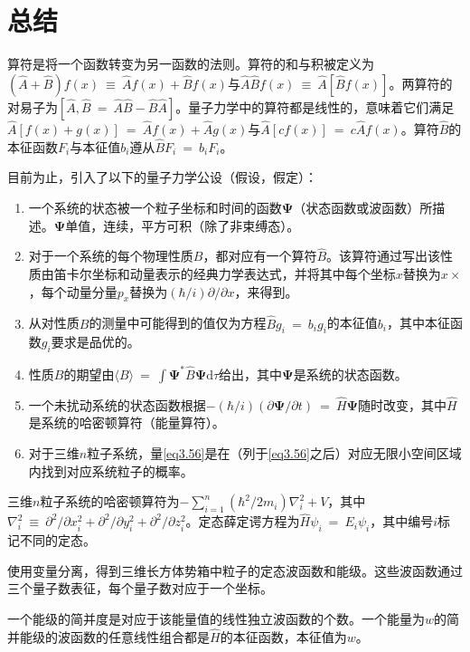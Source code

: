 \documentclass[12pt,a4paper,openany]{ctexbook}
\newcommand{\ang}[1]{\langle #1 \rangle}
\newcommand{\bp}{\bm{\Psi}}
\newcommand{\dd}[1]{\mathrm{d} #1}
\begin{document}
\section*{总结}
\begin{flushleft}
    \setlength{\parindent}{2em}
算符是将一个函数转变为另一函数的法则。算符的和与积被定义为$(\hat{A}+\hat{B})f(x)\ \equiv\ \hat{A}f(x)+\hat{B}f(x)$与$\hat{A}\hat{B}f(x)\ \equiv\ \hat{A}[\hat{B}f(x)]$。两算符的对易子为$[\hat{A},\hat{B}\ =\ \hat{A}\hat{B}-\hat{B}\hat{A}]$。量子力学中的算符都是线性的，意味着它们满足$\hat{A}[f(x)+g(x)]\ =\ \hat{A}f(x)+\hat{A}g(x)$与$\hat{A}[cf(x)]\ =\ c\hat{A}f(x)$。算符$\hat{B}$的本征函数$F_i$与本征值$b_i$遵从$\hat{B}F_i\ =\ b_iF_i$。

目前为止，引入了以下的量子力学公设（假设，假定）：
\begin{enumerate}[label=(\alph*)]
    \item 一个系统的状态被一个粒子坐标和时间的函数$\bp$（状态函数或波函数）所描述。$\bp$单值，连续，平方可积（除了非束缚态）。
    \item 对于一个系统的每个物理性质$B$，都对应有一个算符$\hat{B}$。该算符通过写出该性质由笛卡尔坐标和动量表示的经典力学表达式，并将其中每个坐标$x$替换为$x\times$，每个动量分量$p_x$替换为$(\hbar/i)\partial/\partial x$，来得到。
    \item 从对性质$B$的测量中可能得到的值仅为方程$\hat{B}g_i\ =\ b_ig_i$的本征值$b_i$，其中本征函数$g_i$要求是品优的。
    \item 性质$B$的期望由$\ang{B}\ =\ \int\bp^*\hat{B}\bp\dd\tau$给出，其中$\bp$是系统的状态函数。
    \item 一个未扰动系统的状态函数根据$-(\hbar/i)(\partial\bp/\partial t)\ =\ \hat{H}\bp$随时改变，其中$\hat{H}$是系统的哈密顿算符（能量算符）。
    \item 对于三维$n$粒子系统，量\eqref{eq3.56}是在（列于\eqref{eq3.56}之后）对应无限小空间区域内找到对应系统粒子的概率。
\end{enumerate}

三维$n$粒子系统的哈密顿算符为$-\sum_{i=1}^n(\hbar^2/2m_i)\nabla_i^2+V$，其中$\nabla_i^2\ \equiv\ \partial^2/\partial x_i^2+\partial^2/\partial y_i^2+\partial^2/\partial z_i^2$。定态薛定谔方程为$\hat{H}\psi_i\ =\ E_i\psi_i$，其中编号$i$标记不同的定态。

使用变量分离，得到三维长方体势箱中粒子的定态波函数和能级。这些波函数通过三个量子数表征，每个量子数对应于一个坐标。

一个能级的简并度是对应于该能量值的线性独立波函数的个数。一个能量为$w$的简并能级的波函数的任意线性组合都是$\hat{H}$的本征函数，本征值为$w$。
\end{flushleft}
\end{document}
